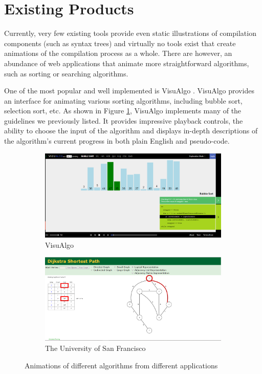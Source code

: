 \documentclass{l4proj}
\begin{document}
\section{Existing Products}
Currently, very few existing tools provide even static illustrations of compilation components (such as syntax trees) and virtually no tools exist that create animations of the compilation process as a whole. There are however, an abundance of web applications that animate more straightforward algorithms, such as sorting or searching algorithms. 

One of the most popular and well implemented is VisuAlgo \cite{visualgo}. VisuAlgo provides an interface for animating various sorting algorithms, including bubble sort, selection sort, etc. As shown in Figure \ref{fig:visualgo}, VisuAlgo implements many of the guidelines we previously listed. It provides impressive playback controls, the ability to choose the input of the algorithm and displays in-depth descriptions of the algorithm's current progress in both plain English and pseudo-code. 

\begin{figure}
	\centering
	\begin{subfigure}[b]{.5\textwidth}
	 	\centering
		\includegraphics[width=.95\linewidth]{images/visualgo.png}
		\caption{VisuAlgo}
		\label{fig:visualgo}
	\end{subfigure}%
	\begin{subfigure}[b]{.5\textwidth}
	  	\centering
		\includegraphics[width=.95\linewidth]{images/dijkstra.png}
		\caption{The University of San Francisco}
		\label{fig:dijkstra}
	\end{subfigure}
	\caption{Animations of different algorithms from different applications}\label{fig:visualgo-dijkstra}	
\end{figure}
\end{document}
